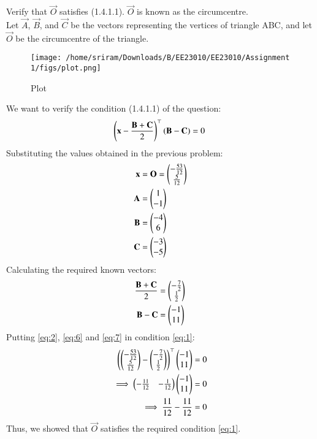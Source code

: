 \documentclass[journal,12pt,twocolumn]{IEEEtran}
\theoremstyle{remark}
\begin{document}
Verify that $\vec{O}$ satisfies (1.4.1.1). $\vec{O}$ is known as the circumcentre.\\\solution
Let $\vec{A}$, $\vec{B}$, and $\vec{C}$ be the vectors representing the vertices of triangle ABC, and let $\vec{O}$ be the circumcentre of the triangle.
\begin{figure}[h]
\texttt{[image: /home/sriram/Downloads/B/EE23010/EE23010/Assignment 1/figs/plot.png]}
\label{fig:circumcircle}
\caption{Plot}
\end{figure}
We want to verify the condition (1.4.1.1) of the question:
\begin{align}
\left(\mathbf{x} - \frac{\mathbf{B} + \mathbf{C}}{2}\right)^\top(\mathbf{B} - \mathbf{C}) = 0\label{eq:1}\
\end{align}
Substituting the values obtained in the previous problem:
\begin{align}
\mathbf{x} &= \mathbf{O} = \begin{pmatrix}-\frac{53}{12}\\\frac{5}{12}\end{pmatrix}\label{eq:2}\\
\mathbf{A} &= \begin{pmatrix}1\\-1\end{pmatrix}\label{eq:3}\\
\mathbf{B} &= \begin{pmatrix}-4\\6\end{pmatrix}\label{eq:4}\\
\mathbf{C} &= \begin{pmatrix}-3\\-5\end{pmatrix}\label{eq:5}
\end{align}
Calculating the required known vectors:
\begin{align}
\frac{\mathbf{B} + \mathbf{C}}{2} &= \begin{pmatrix}-\frac{7}{2}\\\frac{1}{2}\end{pmatrix}\label{eq:6}\\\
\mathbf{B} - \mathbf{C} &= \begin{pmatrix}-1\\11\end{pmatrix}\label{eq:7}\
\end{align}
Putting \eqref{eq:2}, \eqref{eq:6} and \eqref{eq:7} in condition \eqref{eq:1}:
\begin{align}
\left(\begin{pmatrix}-\frac{53}{12}\\\frac{5}{12}\end{pmatrix}-\begin{pmatrix}-\frac{7}{2}\\\frac{1}{2}\end{pmatrix}\right)^\top\begin{pmatrix}-1\\11\end{pmatrix} &= 0\label{eq:8}\\
\implies \begin{pmatrix}-\frac{11}{12}&-\frac{1}{12}\end{pmatrix}\begin{pmatrix}-1\\11\end{pmatrix} &= 0\label{eq:9}\\
\implies \frac{11}{12}-\frac{11}{12}&= 0\label{eq:10} 
\end{align}
Thus, we showed that $\vec{O}$ satisfies the required condition \eqref{eq:1}. 
\end{document}
